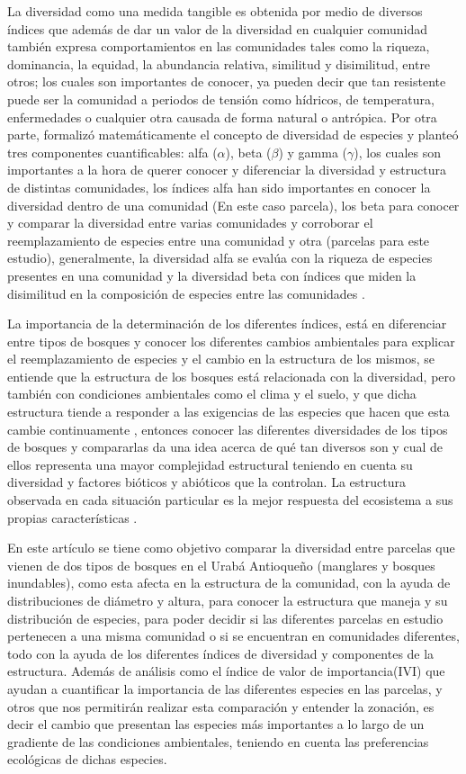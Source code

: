 \documentclass[conference,final,12pt,]{IEEEtran}
\begin{document}
La diversidad como una medida tangible es obtenida por medio de diversos
índices que además de dar un valor de la diversidad en cualquier
comunidad también expresa comportamientos en las comunidades tales como
la riqueza, dominancia, la equidad, la abundancia relativa, similitud y
disimilitud, entre otros; los cuales son importantes de conocer, ya
pueden decir que tan resistente puede ser la comunidad a periodos de
tensión como hídricos, de temperatura, enfermedades o cualquier otra
causada de forma natural o antrópica\citep{D}. Por otra parte, \citep{E}
formalizó matemáticamente el concepto de diversidad de especies y
planteó tres componentes cuantificables: alfa (\(\alpha\)), beta
(\(\beta\)) y gamma (\(\gamma\)), los cuales son importantes a la hora
de querer conocer y diferenciar la diversidad y estructura de distintas
comunidades, los índices alfa han sido importantes en conocer la
diversidad dentro de una comunidad (En este caso parcela), los beta para
conocer y comparar la diversidad entre varias comunidades y corroborar
el reemplazamiento de especies entre una comunidad y otra (parcelas para
este estudio), generalmente, la diversidad alfa se evalúa con la riqueza
de especies presentes en una comunidad y la diversidad beta con índices
que miden la disimilitud en la composición de especies entre las
comunidades \citep{G}.

La importancia de la determinación de los diferentes índices, está en
diferenciar entre tipos de bosques y conocer los diferentes cambios
ambientales para explicar el reemplazamiento de especies y el cambio en
la estructura de los mismos, se entiende que la estructura de los
bosques está relacionada con la diversidad, pero también con condiciones
ambientales como el clima y el suelo\citep{H}, y que dicha estructura
tiende a responder a las exigencias de las especies \citep{J} que hacen
que esta cambie continuamente \citep{I}, entonces conocer las diferentes
diversidades de los tipos de bosques y compararlas da una idea acerca de
qué tan diversos son y cual de ellos representa una mayor complejidad
estructural teniendo en cuenta su diversidad y factores bióticos y
abióticos que la controlan. La estructura observada en cada situación
particular es la mejor respuesta del ecosistema a sus propias
características \citep{F}.

En este artículo se tiene como objetivo comparar la diversidad entre
parcelas que vienen de dos tipos de bosques en el Urabá Antioqueño
(manglares y bosques inundables), como esta afecta en la estructura de
la comunidad, con la ayuda de distribuciones de diámetro y altura, para
conocer la estructura que maneja y su distribución de especies, para
poder decidir si las diferentes parcelas en estudio pertenecen a una
misma comunidad o si se encuentran en comunidades diferentes, todo con
la ayuda de los diferentes índices de diversidad y componentes de la
estructura. Además de análisis como el índice de valor de
importancia(IVI) que ayudan a cuantificar la importancia de las
diferentes especies en las parcelas, y otros que nos permitirán realizar
esta comparación y entender la zonación, es decir el cambio que
presentan las especies más importantes a lo largo de un gradiente de las
condiciones ambientales, teniendo en cuenta las preferencias ecológicas
de dichas especies.
\end{document}
